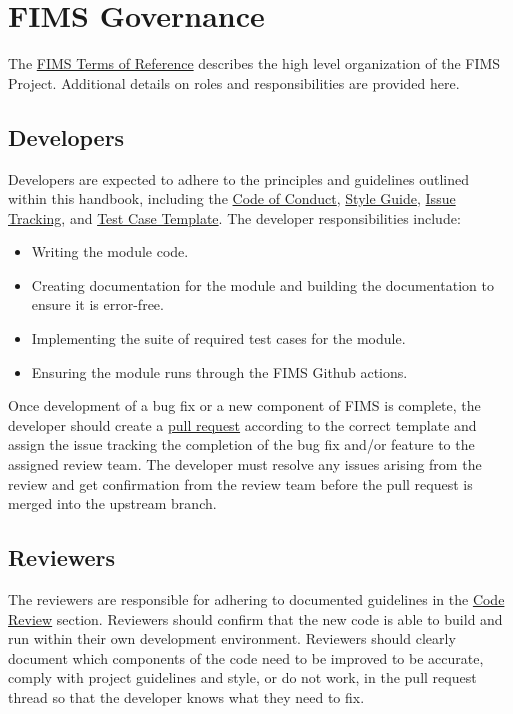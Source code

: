 \documentclass[
]{book}
\providecommand{\tightlist}{%
  \setlength{\itemsep}{0pt}\setlength{\parskip}{0pt}}
\begin{document}
\hypertarget{fims-governance}{%
\chapter{FIMS Governance}\label{fims-governance}}

The \href{https://drive.google.com/file/d/1gMDQbAhjM2E3nct4Hc6u-DT1Ta8bizLd/view?usp=sharing}{FIMS Terms of Reference} describes the high level organization of the FIMS Project. Additional details on roles and responsibilities are provided here.

\hypertarget{developers}{%
\section{Developers}\label{developers}}

Developers are expected to adhere to the principles and guidelines outlined within this handbook, including the \protect\hyperlink{code-of-conduct}{Code of Conduct}, \protect\hyperlink{style-guide}{Style Guide}, \protect\hyperlink{issue-tracking}{Issue Tracking}, and \protect\hyperlink{test-case-template}{Test Case Template}. The developer responsibilities include:

\begin{itemize}
\tightlist
\item
  Writing the module code.
\item
  Creating documentation for the module and building the documentation to ensure it is error-free.
\item
  Implementing the suite of required test cases for the module.
\item
  Ensuring the module runs through the FIMS Github actions.
\end{itemize}

Once development of a bug fix or a new component of FIMS is complete, the developer should create a \protect\hyperlink{pull-requests}{pull request} according to the correct template and assign the issue tracking the completion of the bug fix and/or feature to the assigned review team. The developer must resolve any issues arising from the review and get confirmation from the review team before the pull request is merged into the upstream branch.

\hypertarget{reviewers}{%
\section{Reviewers}\label{reviewers}}

The reviewers are responsible for adhering to documented guidelines in the \protect\hyperlink{code-review}{Code Review} section. Reviewers should confirm that the new code is able to build and run within their own development environment. Reviewers should clearly document which components of the code need to be improved to be accurate, comply with project guidelines and style, or do not work, in the pull request thread so that the developer knows what they need to fix.
\end{document}
